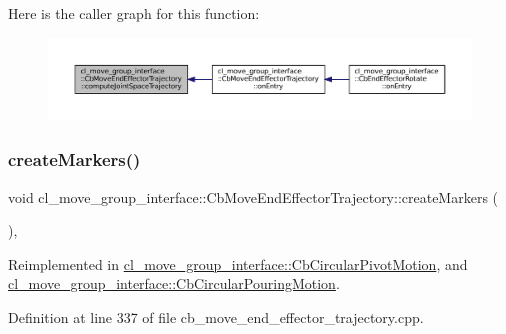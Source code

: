 Here is the caller graph for this function\+:
\nopagebreak
\begin{figure}[H]
\begin{center}
\leavevmode
\includegraphics[width=350pt]{classcl__move__group__interface_1_1CbMoveEndEffectorTrajectory_a485057c052729edd3e8303440b7ada66_icgraph}
\end{center}
\end{figure}
\mbox{\label{classcl__move__group__interface_1_1CbMoveEndEffectorTrajectory_a442efa1d5bc9e9a16f74ecd31b13d9b5}} 
\subsubsection{\texorpdfstring{create\+Markers()}{createMarkers()}}
{\footnotesize\ttfamily void cl\+\_\+move\+\_\+group\+\_\+interface\+::\+Cb\+Move\+End\+Effector\+Trajectory\+::create\+Markers (\begin{DoxyParamCaption}{ }\end{DoxyParamCaption})\hspace{0.3cm}{\ttfamily [protected]}, {\ttfamily [virtual]}}



Reimplemented in \hyperlink{classcl__move__group__interface_1_1CbCircularPivotMotion_a48911ad62608cb00c04e979e2f6f644a}{cl\+\_\+move\+\_\+group\+\_\+interface\+::\+Cb\+Circular\+Pivot\+Motion}, and \hyperlink{classcl__move__group__interface_1_1CbCircularPouringMotion_a26d603b1d9bdbf5b71da6c1c4af2c322}{cl\+\_\+move\+\_\+group\+\_\+interface\+::\+Cb\+Circular\+Pouring\+Motion}.



Definition at line 337 of file cb\+\_\+move\+\_\+end\+\_\+effector\+\_\+trajectory.\+cpp.




